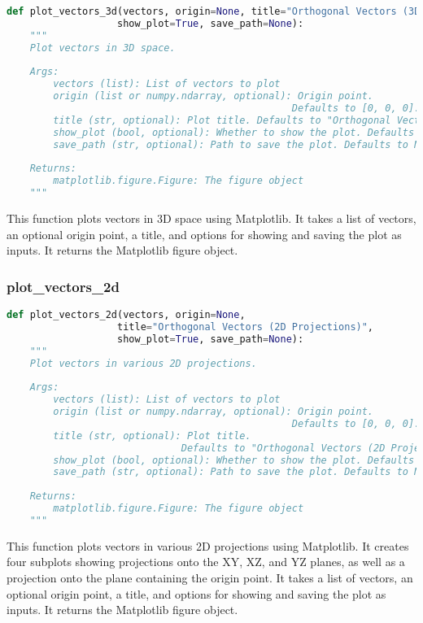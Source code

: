 \begin{lstlisting}[language=Python]
def plot_vectors_3d(vectors, origin=None, title="Orthogonal Vectors (3D)", 
                   show_plot=True, save_path=None):
    """
    Plot vectors in 3D space.
    
    Args:
        vectors (list): List of vectors to plot
        origin (list or numpy.ndarray, optional): Origin point. 
                                                 Defaults to [0, 0, 0].
        title (str, optional): Plot title. Defaults to "Orthogonal Vectors (3D)".
        show_plot (bool, optional): Whether to show the plot. Defaults to True.
        save_path (str, optional): Path to save the plot. Defaults to None.
        
    Returns:
        matplotlib.figure.Figure: The figure object
    """
\end{lstlisting}

This function plots vectors in 3D space using Matplotlib. It takes a list of vectors, an optional origin point, a title, and options for showing and saving the plot as inputs. It returns the Matplotlib figure object.

\subsubsection{plot\_vectors\_2d}

\begin{lstlisting}[language=Python]
def plot_vectors_2d(vectors, origin=None, 
                   title="Orthogonal Vectors (2D Projections)", 
                   show_plot=True, save_path=None):
    """
    Plot vectors in various 2D projections.
    
    Args:
        vectors (list): List of vectors to plot
        origin (list or numpy.ndarray, optional): Origin point. 
                                                 Defaults to [0, 0, 0].
        title (str, optional): Plot title. 
                              Defaults to "Orthogonal Vectors (2D Projections)".
        show_plot (bool, optional): Whether to show the plot. Defaults to True.
        save_path (str, optional): Path to save the plot. Defaults to None.
        
    Returns:
        matplotlib.figure.Figure: The figure object
    """
\end{lstlisting}

This function plots vectors in various 2D projections using Matplotlib. It creates four subplots showing projections onto the XY, XZ, and YZ planes, as well as a projection onto the plane containing the origin point. It takes a list of vectors, an optional origin point, a title, and options for showing and saving the plot as inputs. It returns the Matplotlib figure object.

